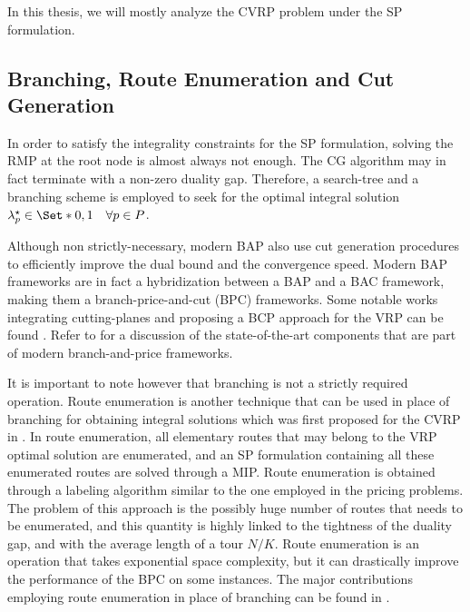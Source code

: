 \medskip

In this thesis, we will mostly analyze the CVRP problem under the SP formulation.

\subsection{Branching, Route Enumeration and Cut Generation}
\label{sec:intro-branching-and-cut-generation-within-bap-frameworks}

In order to satisfy the integrality constraints for the SP formulation,
solving the RMP at the root node is almost always not enough.
The CG algorithm may in fact terminate with a non-zero duality gap.
Therefore,
a search-tree and a branching scheme is employed
to seek for the optimal integral solution $\lambda^\star_p \in \Set*{0, 1} \quad \forall p \in P$.

Although non strictly-necessary, modern BAP also use
cut generation procedures to efficiently improve the dual bound and the convergence speed.
Modern BAP frameworks
are in fact a hybridization between a BAP and a BAC framework,
making them a branch-price-and-cut (BPC) frameworks.
Some notable works integrating cutting-planes and proposing
a BCP approach for the VRP can be found \textcite{fukasawa2006, ropke2012}.
Refer to \textcite{sadykov2019b} for a discussion of the state-of-the-art
components that are part of modern branch-and-price frameworks.

\medskip

It is important to note however that branching is not a strictly required operation.
Route enumeration is another technique that can be used in place of branching
for obtaining integral solutions which was first proposed for the CVRP in \textcite{baldacci2008}.
In route enumeration, all elementary routes that may belong to the VRP optimal solution are enumerated,
and an SP formulation containing all these enumerated routes are solved through a MIP.
Route enumeration is obtained through a labeling algorithm similar to the one employed in the pricing problems.
The problem of this approach is the possibly huge number of routes that needs to be enumerated,
and this quantity is highly linked to the tightness of the duality gap,
and with the average length of a tour $N / K$.
Route enumeration is an operation that takes exponential space complexity,
but it can drastically improve the performance of the BPC on some instances.
The major contributions employing route enumeration in place of branching can be found in
\textcite{baldacci2008,baldacci2011}.

